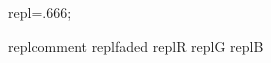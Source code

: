 
\Newskip repl=.666\bigskipamount;

\DefStyle replcomment {\color{faded}}
\DefStyle replfaded {\color{faded}}
\DefStyle replR {\aRstyle}
\DefStyle replG {\aGstyle}
\DefStyle replB {\aBstyle}

\def\replalertstyle{\ifreplignorealerts\else\alertstyle\fi}

\newcount\repllineno
\newif\ifrepllabline
\newif\ifreplhidelineno
\newif\ifreplmath
\newif\ifreplalert
\newif\ifreplcross
\newif\ifreplmeaning
\newif\ifreplcomputation
\newif\ifreplcontinuation
\newif\ifreplskipcount
\newif\ifreplignorealerts
\newif\ifreplphantom
\newif\ifreplhide


\def\replhandleopts#1{%
\def\thisrepllinestyles{}%
\WhenStrContains{#1}{-}{\addto\thisrepllinestyles{\replcommentstyle}}%
\WhenStrContains{#1}{a}{\replalerttrue\addto\thisrepllinestyles{\replalertstyle}}%
\WhenStrContains{#1}{f}{\addto\thisrepllinestyles{\replfadedstyle}}%
\WhenStrContains{#1}{R}{\addto\thisrepllinestyles{\replRstyle}}%
\WhenStrContains{#1}{G}{\addto\thisrepllinestyles{\replGstyle}}%
\WhenStrContains{#1}{B}{\addto\thisrepllinestyles{\replBstyle}}%
\WhenStrContains{#1}{c}{\replcomputationtrue}%
\WhenStrContains{#1}{,}{\replcontinuationtrue}%
\WhenStrContains{#1}{t}{\addto\thisrepllinestyles{\replmathfalse}}%
\WhenStrContains{#1}{m}{\addto\thisrepllinestyles{\replmathtrue}}%
\WhenStrContains{#1}{/}{\addto\thisrepllinestyles{\replcrosstrue}}%
\WhenStrContains{#1}{=}{\addto\thisrepllinestyles{\replmeaningtrue}}%
\WhenStrContains{#1}{x}{\replphantomtrue}%
\WhenStrContains{#1}{X}{\replhidetrue}%
}

\newbox\replmaxscript
\newbox\replmaxgiven
\newbox\replmaxgoal
\newdimen\replscriptwidth
\newdimen\replgivenswidth
\newdimen\replgoalswidth

\def\setreplmaxscript#1{\global\setbox\replmaxscript\hbox{#1}\global\replscriptwidth=\wd\replmaxscript}
\def\setreplmaxgiven#1{\global\setbox\replmaxgiven\hbox{#1}\global\replgivenswidth=\wd\replmaxgiven}
\def\setreplmaxgoal#1{\global\setbox\replmaxgoal\hbox{#1}\global\replgoalswidth=\wd\replmaxgoal}

